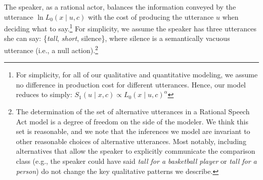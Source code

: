 \documentclass[doc, floatsintext]{apa6}
\begin{document}
The speaker, as a rational actor, balances the information conveyed by the utterance $\ln L_{0}(x \mid u, c)$ with the cost of producing the utterance $u$ when deciding what to say.\footnote{For simplicity, for all of our qualitative and quantitative modeling, we assume no difference in production cost for different utterances. Hence, our model reduces to simply: $S_1(u \mid x, c) \propto L_{0}(x \mid u, c)^{ \alpha}$}
For simplicity, we assume the speaker has three utterances she can say: \{\emph{tall}, \emph{short}, silence\}, where silence is a semantically vacuous utterance (i.e., a null action).\footnote{The determination of the set of alternative utterances in a Rational Speech Act model is a degree of freedom on the side of the modeler. We think this set is reasonable, and we note that the inferences we model are invariant to other reasonable choices of alternative utterances. Most notably, including alternatives that allow the speaker to explicitly communicate the comparison class (e.g., the speaker could have said \emph{tall for a basketball player} or \emph{tall for a person}) do not change the key qualitative patterns we describe.
}
\end{document}
